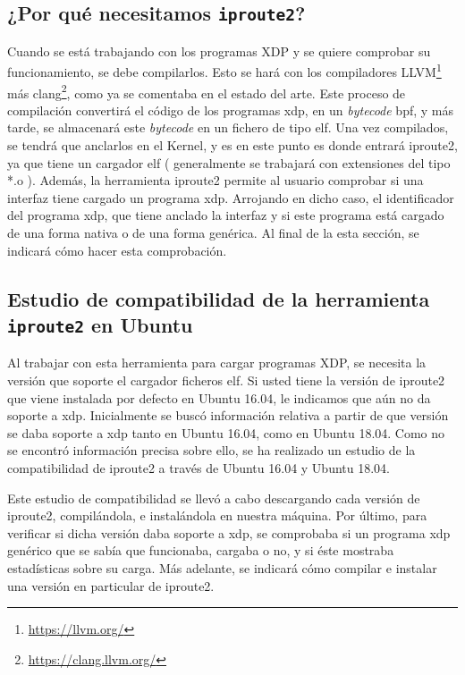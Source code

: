 \subsection{¿Por qué necesitamos \texttt{iproute2}?}

Cuando se está trabajando con los programas XDP y se quiere comprobar su funcionamiento, se debe compilarlos. Esto se hará con los compiladores LLVM\footnote{\url{https://llvm.org/}} más clang\footnote{\url{https://clang.llvm.org/}}, como ya se comentaba en el estado del arte. Este proceso de compilación convertirá el código de los programas \gls{xdp}, en un \textit{bytecode} \gls{bpf}, y más tarde, se almacenará este \textit{bytecode} en un fichero de tipo \gls{elf}. Una vez compilados, se tendrá que anclarlos en el Kernel, y es  en este punto es donde entrará iproute2, ya que tiene un cargador \gls{elf} ( generalmente se trabajará con extensiones del tipo *.o ). \newline
\newline
Además, la herramienta iproute2 permite al usuario comprobar si una interfaz tiene cargado un programa \gls{xdp}. Arrojando en dicho caso, el identificador del programa \gls{xdp}, que tiene anclado la interfaz y si este programa está cargado de una forma nativa o de una forma genérica. Al final de la esta sección, se indicará cómo hacer esta comprobación.

\subsection{Estudio de compatibilidad de la herramienta \texttt{iproute2} en Ubuntu}

Al trabajar con esta herramienta para cargar programas XDP, se necesita  la versión que soporte el cargador ficheros \gls{elf}. Si usted tiene la versión de iproute2 que viene instalada por defecto en Ubuntu 16.04, le indicamos que aún no da soporte a \gls{xdp}. Inicialmente se buscó información relativa a partir de que versión se daba soporte a \gls{xdp} tanto en Ubuntu 16.04, como en Ubuntu 18.04. Como no se encontró información precisa sobre ello, se ha realizado un estudio de la compatibilidad de iproute2 a través de Ubuntu 16.04 y Ubuntu 18.04.\\
\par

Este estudio de compatibilidad se llevó a cabo descargando cada versión de iproute2, compilándola, e instalándola en nuestra máquina. Por último, para verificar si dicha versión daba soporte a \gls{xdp}, se comprobaba si un programa \gls{xdp} genérico que se sabía que funcionaba, cargaba o no, y si éste mostraba estadísticas sobre su carga. Más adelante, se indicará cómo compilar e instalar una versión en particular de iproute2.  \\
\par

